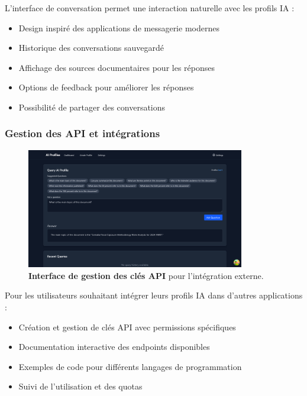 L'interface de conversation permet une interaction naturelle avec les profils IA :

\begin{itemize}
  \item Design inspiré des applications de messagerie modernes
  \item Historique des conversations sauvegardé
  \item Affichage des sources documentaires pour les réponses
  \item Options de feedback pour améliorer les réponses
  \item Possibilité de partager des conversations
\end{itemize}

\subsubsection{Gestion des API et intégrations}

\begin{figure}[H]
  \centering
  \includegraphics[width=0.85\textwidth,keepaspectratio]{pfe-pics/ai-profile-creation/Screenshot 2025-06-09 at 23-20-35 Vite React TS.png}
  \caption{\textbf{Interface de gestion des clés API} pour l'intégration externe.}
  \label{fig:api_management}
\end{figure}

Pour les utilisateurs souhaitant intégrer leurs profils IA dans d'autres applications :

\begin{itemize}
  \item Création et gestion de clés API avec permissions spécifiques
  \item Documentation interactive des endpoints disponibles
  \item Exemples de code pour différents langages de programmation
  \item Suivi de l'utilisation et des quotas
\end{itemize}

